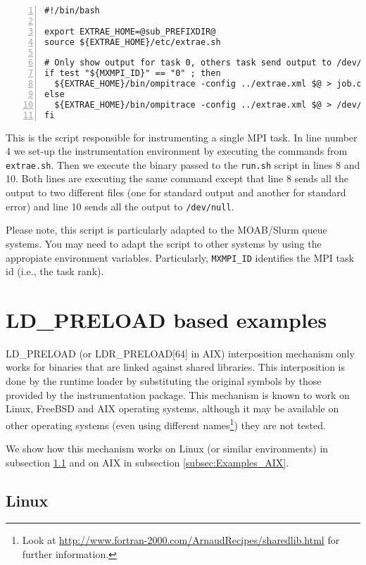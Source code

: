 \begin{Verbatim}[frame=single,numbers=left,labelposition=topline,label=run.sh]
#!/bin/bash

export EXTRAE_HOME=@sub_PREFIXDIR@
source ${EXTRAE_HOME}/etc/extrae.sh

# Only show output for task 0, others task send output to /dev/null
if test "${MXMPI_ID}" == "0" ; then
  ${EXTRAE_HOME}/bin/ompitrace -config ../extrae.xml $@ > job.out 2> job.err
else
  ${EXTRAE_HOME}/bin/ompitrace -config ../extrae.xml $@ > /dev/null 2> /dev/null
fi
\end{Verbatim}

This is the script responsible for instrumenting a single MPI task. In line number 4 we set-up the instrumentation environment by executing the commands from {\tt extrae.sh}. Then we execute the binary passed to the {\tt run.sh} script in lines 8 and 10. Both lines are executing the same command except that line 8 sends all the output to two different files (one for standard output and another for standard error) and line 10 sends all the output to {\tt /dev/null}.

Please note, this script is particularly adapted to the MOAB/Slurm queue systems. You may need to adapt the script to other systems by using the appropiate environment variables. Particularly, {\tt MXMPI\_ID} identifies the MPI task id (i.e., the task rank).

\section{LD\_PRELOAD based examples}\label{sec:Examples_LDPRELOAD}

LD\_PRELOAD (or LDR\_PRELOAD[64] in AIX) interposition mechanism only works for binaries that are linked against shared libraries. This interposition is done by the runtime loader by substituting the original symbols by those provided by the instrumentation package. This mechanism is known to work on Linux, FreeBSD and AIX operating systems, although it may be available on other operating systems (even using different names\footnote{Look at \url{http://www.fortran-2000.com/ArnaudRecipes/sharedlib.html} for further information.}) they are not tested.

We show how this mechanism works on Linux (or similar environments) in subsection \ref{subsec:Examples_Linux} and on AIX in subsection \ref{subsec:Examples_AIX}.

\subsection{Linux}\label{subsec:Examples_Linux}

